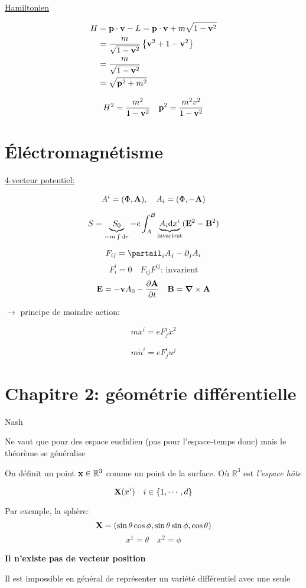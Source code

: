 \underline{Hamiltonien} 


\begin{align*}
    H &= \vb{p}\cdot \vb{v}-L = \vb{p}\cdot \vb{v}+m\sqrt{1-\vb{v}^2}\\ &= \frac{m}{\sqrt{1-\vb{v}^2}} \left\{ \vb{v}^2 +1 - \vb{v}^2 \right\}\\ &= \frac{m}{\sqrt{1-\vb{v}^2}}\\ &= \sqrt{\vb{p}^2 +m^2} 
\end{align*}

$$H^{2}= \frac{m^{2}}{1-\vb{v}^2} \quad \vb{p}^2 =\frac{m^2v^{2}}{1-\vb{v}^2}  $$ 


\section*{Éléctromagnétisme}

\underline{4-vecteur potentiel:}

$$A^i = (\Phi, \vb{A}), \quad A_i = (\Phi, -\vb{A})$$ 


$$S = \underbrace{S_0 }_{ -m\int \dd \tau  } - e \int_{A}^{B} \underbrace{A_i \dd x^i}_{\text{invarient} } (\vb{E}^2 - \vb{B}^2)  $$ 


\begin{tcolorbox}[title=Tensuer de Faraday  ]
    $$F_{ij} = \partail_i A_j - \partial_j A_i $$ 
    $$F^i_i =0 \quad F_{ij} F^{ij} \text{: invarient} $$ 
    $$\vb{E}= - \vb{v}A_0 - \pdv{\vb{A}}{t} \quad \vb{B} = \grad \times \vb{A}$$ 
\end{tcolorbox}


$\to$ principe de moindre action: 

$$\boxed{ m\ddot x^i  = e F_j^{i} \dot x^{2}}$$ 

$$\boxed{m \dot u^{i}=eF_j^{i}u^{j}}$$ 


\section*{Chapitre 2: géométrie différentielle}

\begin{tcolorbox}[title=Théorème du plongement]
    Nash
    
    Ne vaut que pour des espace euclidien (pas pour l'espace-temps donc) mais le théorème se généralise

    On définit un point $\vb{x} \in \mathbb{R}^{3} $ comme un point de la surface. Où $\mathbb{R}^{3} $ est \textit{l'espace hôte}  

    $$\vb{X} (x^{i})  \quad i \in \{1,\dotsb, d\} $$ 

    Par exemple, la sphère: $$\vb{X}= (\sin\theta\cos\phi, \sin\theta\sin\phi, \cos\theta)$$
    $$x^{1}=\theta \quad x^{2}=\phi$$ 

    {\bf{Il n'existe pas de vecteur position}}
     
    Il est impossible en général de représenter un variété différentiel avec une seule 

\end{tcolorbox}

